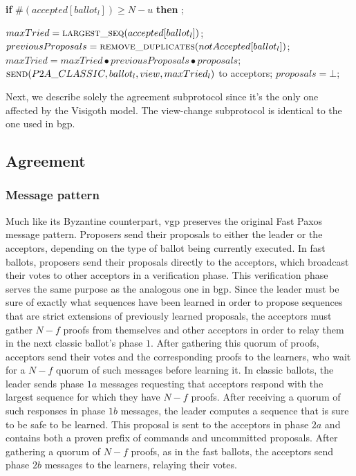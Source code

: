 \begin{algorithm}
\begin{algorithmic}[1]
		\State 
		\State \hspace{\algorithmicindent}\hspace{\algorithmicindent} \textbf{if} $\#(accepted[ballot_l]) \geq N-u$ \textbf{then} 
		\State \hspace{\algorithmicindent}\hspace{\algorithmicindent}\hspace{\algorithmicindent} ;
		
		\State
		\State $maxTried = \Call{largest\_seq}{accepted[ballot_l]}$;
		\State $previousProposals = \Call{remove\_duplicates}{notAccepted[ballot_l]}$;
		\State $maxTried = maxTried \bullet previousProposals \bullet proposals$;
		\State $\Call{send}{P2A\_CLASSIC,ballot_l,view, maxTried_l}$ to acceptors;
		\State $proposals = \bot$;
		\EndFunction
		
	\end{algorithmic}
\end{algorithm}

Next, we describe solely the agreement subprotocol since it's the only one affected by the Visigoth model. The view-change subprotocol is identical to the one used in \acrfull{bgp}.

\subsection{Agreement}

\subsubsection{Message pattern}
Much like its Byzantine counterpart, \acrshort{vgp} preserves the original Fast Paxos message pattern. Proposers send their proposals to either the leader or the acceptors, depending on the type of ballot being currently executed. In fast ballots, proposers send their proposals directly to the acceptors, which broadcast their votes to other acceptors in a verification phase. This verification phase serves the same purpose as the analogous one in \acrshort{bgp}. Since the leader must be sure of exactly what sequences have been learned in order to propose sequences that are strict extensions of previously learned proposals, the acceptors must gather $N-f$ proofs from themselves and other acceptors in order to relay them in the next classic ballot's phase $1$. After gathering this quorum of proofs, acceptors send their votes and the corresponding proofs to the learners, who wait for a $N-f$ quorum of such messages before learning it. In classic ballots, the leader sends phase $1a$ messages requesting that acceptors respond with the largest sequence for which they have $N-f$ proofs. After receiving a quorum of such responses in phase $1b$ messages, the leader computes a sequence that is sure to be safe to be learned. This proposal is sent to the acceptors in phase $2a$ and contains both a proven prefix of commands and uncommitted proposals. After gathering a quorum of $N-f$ proofs, as in the fast ballots, the acceptors send phase $2b$ messages to the learners, relaying their votes.

